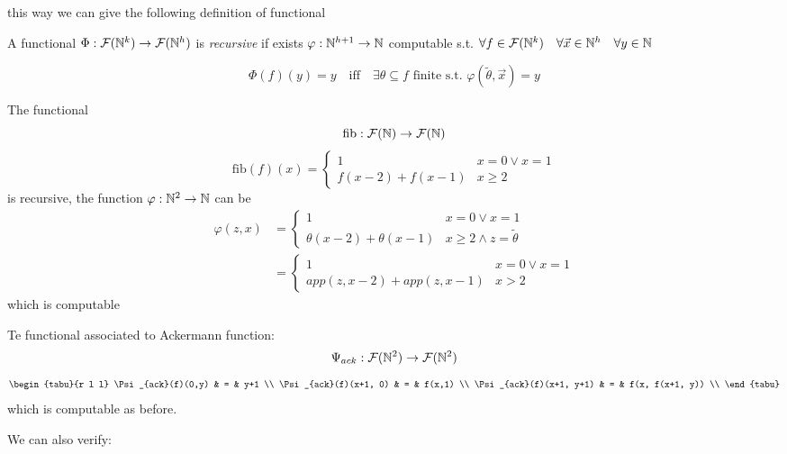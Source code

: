 this way we can give the following definition of functional

\begin{definition}
  A functional
  $\Phi : \mathcal{F}(\mathbb{N}^k) \to \mathcal{F}(\mathbb{N}^h)$ is
  \emph{recursive} if exists $\varphi : \mathbb{N}^{h+1} \to \mathbb{N}$
  computable s.t.
  $\forall f \in \mathcal{F}(\mathbb{N}^k) \quad \forall \vec{x} \in \mathbb{N}^h
  \quad \forall y \in \mathbb{N}$

  \[
    \Phi(f)(y) = y \quad \mbox{iff} \quad \exists \theta \subseteq f
    \mbox{ finite s.t. } \varphi(\tilde{\theta}, \vec{x}) = y
  \]
\end{definition}

\begin{example}
  The functional
  \newcommand{\fib}[1]{\ensuremath{\mbox{fib}(#1)}}
  \[
    \mbox{fib} : \mathcal{F}(\mathbb{N}) \to \mathcal{F}(\mathbb{N})
  \]
  \[
    \fib{f}(x) = \begin{cases}
      1 & x=0 \lor x=1 \\
      f(x-2) + f(x-1) & x \geq 2
    \end{cases}
  \]
  is recursive, the function $\varphi: \mathbb{N}^2 \to \mathbb{N}$ can be
  \[
    \begin{aligned}
      \varphi(z, x) &= \begin{cases}
        1 & x=0 \lor x=1 \\
        \theta(x-2) + \theta(x-1) & x \geq 2 \land z = \tilde{\theta}
      \end{cases} \\
      &= \begin{cases}
        1 & x = 0 \lor x = 1 \\
        app(z, x-2) + app(z, x-1) & x > 2
      \end{cases}
    \end{aligned}
  \]
  which is computable
\end{example}

\begin{example}
Te functional associated to Ackermann function:
\[
  \Psi_{ack} : \mathcal{F}(\mathbb{N}^2) \to \mathcal{F}(\mathbb{N}^2)
\]
\[
  \begin{tabu}{r l l}
    \Psi_{ack}(f)(0,y)  & = & y+1 \\
    \Psi_{ack}(f)(x+1, 0) & = & f(x,1) \\
    \Psi_{ack}(f)(x+1, y+1)  & = & f(x, f(x+1, y)) \\
  \end{tabu}
\]
which is computable as before.
\end{example}
We can also verify:

